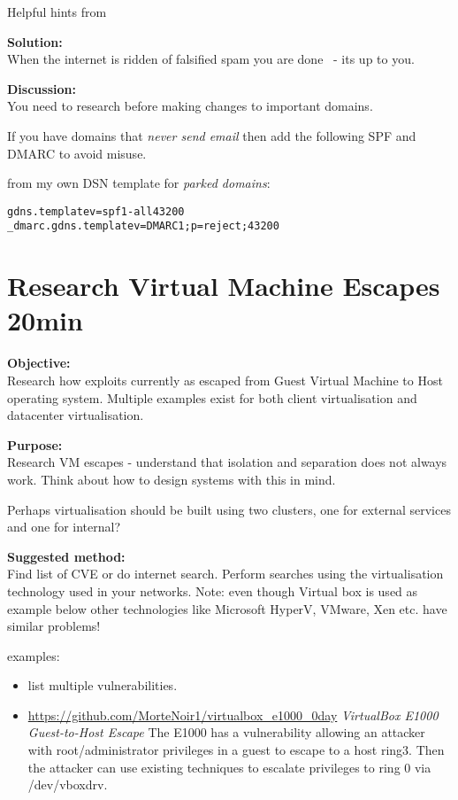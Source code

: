 \documentclass[a4paper,11pt,notitlepage]{report}
\begin{document}
Helpful hints from 


{\bf Solution:}\\
When the internet is ridden of falsified spam you are done \smiley\ - its up to you.

{\bf Discussion:}\\
You need to research before making changes to important domains.

If you have domains that \emph{never send email} then add the following SPF and DMARC to avoid misuse.

from my own DSN template for \emph{parked domains}:
\begin{alltt}
gdns.template	v=spf1 -all	43200
_dmarc.gdns.template	v=DMARC1; p=reject;	43200
\end{alltt}



\chapter{Research Virtual Machine Escapes 20min}
\label{ex:vm-escape}


{\bf Objective:}\\
Research how exploits currently as escaped from Guest Virtual Machine to Host operating system. Multiple examples exist for both client virtualisation and datacenter virtualisation.

{\bf Purpose:}\\
Research VM escapes - understand that isolation and separation does not always work. Think about how to design systems with this in mind.

Perhaps virtualisation should be built using two clusters, one for external services and one for internal?

{\bf Suggested method:}\\
Find list of CVE or do internet search. Perform searches using the virtualisation technology used in your networks. Note: even though Virtual box is used as example below other technologies like Microsoft HyperV, VMware, Xen etc. have similar problems!


examples:

\begin{itemize}
\item {} list multiple vulnerabilities.
\item \url{https://github.com/MorteNoir1/virtualbox_e1000_0day} \emph{VirtualBox E1000 Guest-to-Host Escape} The E1000 has a vulnerability allowing an attacker with root/administrator privileges in a guest to escape to a host ring3. Then the attacker can use existing techniques to escalate privileges to ring 0 via /dev/vboxdrv.
\end{itemize}
\end{document}
